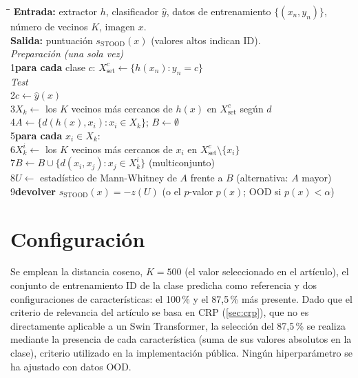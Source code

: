 \begin{algoritmo}[tbp]
\caption{Detección OOD con STOOD-X (sin la etapa de explicación).}\label{alg:stoodx}
\begin{tabbing}
\hspace{1.5em}\=\hspace{1.5em}\=\hspace{1.5em}\=\kill
\textbf{Entrada:} extractor $h$, clasificador $\hat y$, datos de entrenamiento $\{(x_n, y_n)\}$, número de vecinos $K$, imagen $x$.\\
\textbf{Salida:} puntuación $s_{\mathrm{STOOD}}(x)$ (valores altos indican ID).\\[2pt]
\emph{Preparación (una sola vez)}\\
1\>\textbf{para cada} clase $c$: $X_{\mathrm{set}}^{c} \gets \{h(x_n) : y_n = c\}$\\[2pt]
\emph{Test}\\
2\>$c \gets \hat y(x)$\\
3\>$X_k \gets$ los $K$ vecinos más cercanos de $h(x)$ en $X_{\mathrm{set}}^{c}$ según $d$\\
4\>$A \gets \{ d(h(x), x_i) : x_i \in X_k \}$; \quad $B \gets \emptyset$\\
5\>\textbf{para cada} $x_i \in X_k$:\\
6\>\>$X_k^{i} \gets$ los $K$ vecinos más cercanos de $x_i$ en $X_{\mathrm{set}}^{c} \setminus \{x_i\}$\\
7\>\>$B \gets B \cup \{ d(x_i, x_j) : x_j \in X_k^{i} \}$ \quad (multiconjunto)\\
8\>$U \gets$ estadístico de Mann-Whitney de $A$ frente a $B$ (alternativa: $A$ mayor)\\
9\>\textbf{devolver} $s_{\mathrm{STOOD}}(x) = -z(U)$ \quad (o el $p$-valor $p(x)$; OOD si $p(x) < \alpha$)
\end{tabbing}
\end{algoritmo}


\section{Configuración}\label{sec:stoodx-configuracion}

Se emplean la distancia coseno, $K = 500$ (el valor seleccionado en el artículo), el conjunto de entrenamiento ID de la clase predicha como referencia y dos configuraciones de características: el 100\,\% y el 87,5\,\% más presente. Dado que el criterio de relevancia del artículo se basa en CRP (\cref{sec:crp}), que no es directamente aplicable a un Swin Transformer, la selección del 87,5\,\% se realiza mediante la presencia de cada característica (suma de sus valores absolutos en la clase), criterio utilizado en la implementación pública. Ningún hiperparámetro se ha ajustado con datos OOD.


